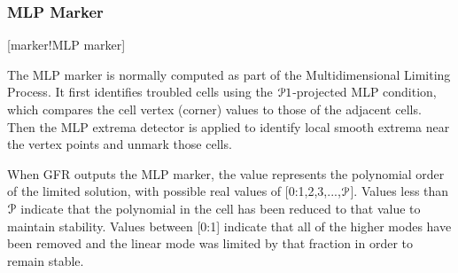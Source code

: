 \subsubsection{MLP Marker}
\label{SEC:MLPMarker}
\key*{}[marker!MLP marker]


The MLP marker is normally computed as part of the
Multidimensional Limiting Process\cite{Park_2014,Park_2016,Park_2017}.
%
It first identifies troubled cells using the
$\PO[1]$-projected MLP condition, which compares the cell vertex (corner)
values to those of the adjacent cells.
%
Then the MLP extrema detector is applied to identify local smooth extrema
near the vertex points and unmark those cells.


When GFR outputs the MLP marker, the value \marker{} represents the
polynomial order of the limited solution,
with possible real values of [0:1,2,3,...,$\PO$].
%
Values less than $\PO$ indicate that the polynomial in the cell
has been reduced to that value to maintain stability.
%
Values between [0:1] indicate that all of the higher modes have been removed
and the linear mode was limited by that fraction in order to remain stable.





